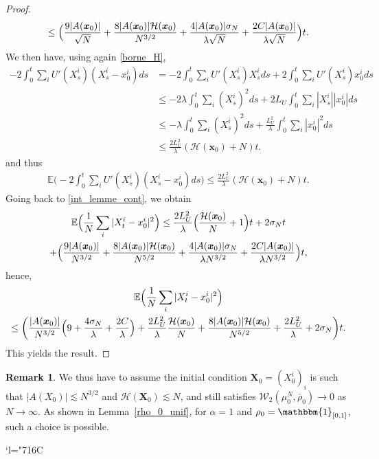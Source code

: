 \documentclass[JEP,XML,SOM,Unicode,published]{cedram}
\newcommand{\Changelback}{\mathcode`l="716C}
\let\mathds\mathbbm
\newcommand{\bx}{{\boldsymbol{x}}}
\newcommand{\bX}{{\boldsymbol{X}}}
\theoremstyle{plain}
\theoremstyle{definition}
\newtheorem{remark}{Remark}[section]
\begin{document}
\begin{proof}
\begin{multline*}
\leq \Bigl(\frac{9|A(\bx_0)|}{\sqrt{N}}+\frac{8|A(\bx_0)|\mathcal{H}(\bx_0)}{N^{3/2}}+\frac{4|A(\bx_0)|\sigma_N}{\lambda\sqrt{N}}+\frac{2C|A(\bx_0)|}{\lambda \sqrt{N}}\Bigr)t.
\end{multline*}
We then have, using again \eqref{borne_H},
\begin{align*}
-2 \int_0^t\sum_iU'(X^i_s)(X^i_s-x^i_0)ds&=-2\int_0^t\sum_iU'(X^i_s)X^i_sds+2\int_0^t\sum_iU'(X^i_s)x^i_0ds\\
&\leq -2\lambda\int_0^t\sum_i(X^i_s)^2ds+2L_U\int_0^t\sum_i|X^i_s||x^i_0|ds\\
&\leq -\lambda\int_0^t\sum_i(X^i_s)^2ds+\frac{L_U^2}{\lambda}\int_0^t\sum_i|x^i_0|^2ds\\
&\leq \frac{2L_U^2}{\lambda}(\mathcal{H}(\bx_0)+N)t.
\end{align*}
and thus
\begin{align*}
\mathbb{E}\biggl(-2\int_0^t\sum_iU'(X^i_s)(X^i_s-x^i_0)ds\biggr)\leq \frac{2L_U^2}{\lambda}(\mathcal{H}(\bx_0)+N)t.
\end{align*}
Going back to \eqref{int_lemme_cont}, we obtain
\begin{multline*}
\mathbb{E}\Bigl(\frac{1}{N}\sum_{i}|X^i_t-x^i_0|^2\Bigr)\leq \frac{2L_U^2}{\lambda}\Bigl(\frac{\mathcal{H}(\bx_0)}{N}+1\Bigr)t+2\sigma_N t\\
+\Bigl(\frac{9|A(\bx_0)|}{N^{3/2}}+\frac{8|A(\bx_0)|\mathcal{H}(\bx_0)}{N^{5/2}}+\frac{4|A(\bx_0)|\sigma_N}{\lambda N^{3/2}}+\frac{2C|A(\bx_0)|}{\lambda N^{3/2}}\Bigr)t,
\end{multline*}
hence,
\begin{multline*}
\mathbb{E}\Bigl(\frac{1}{N}\sum_{i}|X^i_t-x^i_0|^2\Bigr)\\
\leq \biggl(\frac{|A(\bx_0)|}{N^{3/2}}\Bigl(9+\frac{4\sigma_N}{\lambda}+\frac{2C}{\lambda}\Bigr)
+\frac{2L_U^2}{\lambda}\frac{\mathcal{H}(\bx_0)}{N}+\frac{8|A(\bx_0)|\mathcal{H}(\bx_0)}{N^{5/2}}+\frac{2L_U^2}{\lambda}+2\sigma_N\biggr)t.
\end{multline*}
This yields the result.
\end{proof}

\begin{remark}
We thus have to assume the initial condition $\bX_0=\left(X^i_0\right)_i$ is such that $|A(X_0)|\lesssim N^{3/2}$ and $\mathcal{H}(\bX_0)\lesssim N$, and still satisfies $\mathcal{W}_2(\mu^N_0,\bar{\rho}_0)\to0$ as $N\to\infty$. As shown in Lemma~\ref{rho_0_unif}, for $\alpha=1$ and $\rho_0=\mathds{1}_{[0,1]}$, such a choice is possible.
\end{remark}

\Changelback




\end{document}
